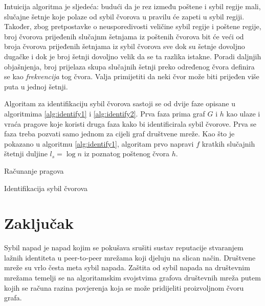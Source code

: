 \documentclass[times, utf8, seminar, numeric]{fer}
\begin{document}
Intuicija algoritma je sljedeća: budući da je rez između poštene i sybil regije mali, slučajne šetnje koje polaze od sybil čvorova u pravilu će zapeti u sybil regiji. Također, zbog pretpostavke o neusporedivosti veličine sybil regije i poštene regije, broj čvorova prijeđenih slučajnm šetnjama iz poštenih čvorova bit će veći od broja čvorova prijeđenih šetnjama iz sybil čvorova sve dok su šetnje dovoljno dugačke i dok je broj šetnji dovoljno velik da se ta razlika istakne. Poradi daljnjih objašnjenja, broj prijelaza skupa slučajnih šetnji preko određenog čvora definira se kao \textit{frekvencija} tog čvora. Valja primijetiti da neki čvor može biti prijeđen više puta u jednoj šetnji.

Algoritam za identifikaciju sybil čvorova sastoji se od dvije faze opisane u algoritmima \ref{alg:identify1} i \ref{alg:identify2}. Prva faza prima graf $G$ i $h$ kao ulaze i vraća pragove koje koristi druga faza kako bi identificirala sybil čvorove. Prva se faza treba pozvati samo jednom za cijeli graf društvene mreže. Kao što je pokazano u algoritmu \ref{alg:identify1}, algoritam prvo napravi $f$ kratkih slučajnih štetnji duljine $l_s = \log n$ iz poznatog poštenog čvora $h$.

\begin{algorithm}[h]
	\caption{Računanje pragova}
	\label{alg:identify1}
\end{algorithm}

\begin{algorithm}[h]
	\caption{Identifikacija sybil čvorova}
	\label{alg:identify2}
\end{algorithm}

\chapter{Zaključak}




\begin{sazetak}
  Sybil napad je napad kojim se pokušava srušiti sustav reputacije stvaranjem lažnih identiteta u peer-to-peer mrežama koji djeluju na slican način. Društvene mreže su vrlo česta meta sybil napada. Zaštita od sybil napada na društevnim mrežama temelji se na algoritamskim svojstvima grafova društevnih mreža putem kojih se računa razina povjerenja koja se može pridijeliti proizvoljnom čvoru grafa.

\end{sazetak}
\end{document}
